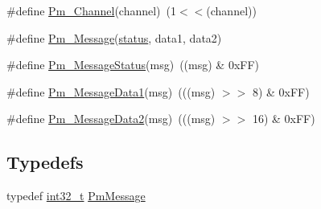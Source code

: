 \begin{DoxyCompactItemize}
\#define \hyperlink{group__grp__events__filters_ga33262c53c6591f143fc61e12a8e2205c}{Pm\+\_\+\+Channel}(channel)~(1$<$$<$(channel))
\item 
\#define \hyperlink{group__grp__events__filters_gaf1c22515214f7a2cbb1e1e8fb02602bd}{Pm\+\_\+\+Message}(\hyperlink{rfft2d_test_m_l_8m_a1b5437a866e6f95107b07ba845bc1800}{status},  data1,  data2)
\item 
\#define \hyperlink{group__grp__events__filters_ga729fed9ce1244a4052ef68527706eaf9}{Pm\+\_\+\+Message\+Status}(msg)~((msg) \& 0x\+F\+F)
\item 
\#define \hyperlink{group__grp__events__filters_ga9b7776c54c8c7a1ce68101070ecb9c19}{Pm\+\_\+\+Message\+Data1}(msg)~(((msg) $>$$>$ 8) \& 0x\+F\+F)
\item 
\#define \hyperlink{group__grp__events__filters_gaefddbd9fdc825fe9e107e935eae17811}{Pm\+\_\+\+Message\+Data2}(msg)~(((msg) $>$$>$ 16) \& 0x\+F\+F)
\end{DoxyCompactItemize}
\subsection*{Typedefs}
\begin{DoxyCompactItemize}
\item 
typedef \hyperlink{lib-src_2ffmpeg_2win32_2stdint_8h_a37994e3b11c72957c6f454c6ec96d43d}{int32\+\_\+t} \hyperlink{group__grp__events__filters_gad8455e4afe978a74c68e345bef99761d}{Pm\+Message}
\end{DoxyCompactItemize}
